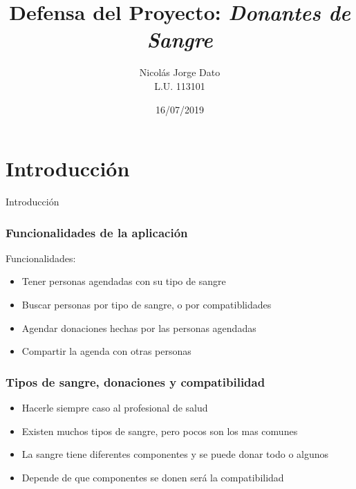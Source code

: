 \documentclass{beamer}
\title{Defensa del Proyecto: \emph{Donantes de Sangre}}
\author{Nicol\'as Jorge Dato\\L.U. 113101}
\institute{Universidad Nacional del Sur}
\date{16/07/2019}
\begin{document}
	\begin{frame}
		\maketitle
	\end{frame}

	\section{Introducci\'on}
		\begin{frame}
			\Huge Introducci\'on
		\end{frame}
		\begin{frame}
			\frametitle{Funcionalidades de la aplicaci\'on}
			Funcionalidades:
			\begin{itemize}
				\item Tener personas agendadas con su tipo de sangre
				\item Buscar personas por tipo de sangre, o por compatiblidades
				\item Agendar donaciones hechas por las personas agendadas
				\item Compartir la agenda con otras personas
			\end{itemize}
		\end{frame}
		\begin{frame}
			\frametitle{Tipos de sangre, donaciones y compatibilidad}
			\begin{itemize}
				\item Hacerle siempre caso al profesional de salud
				\item Existen muchos tipos de sangre, pero pocos son los mas comunes
				\item La sangre tiene diferentes componentes y se puede donar todo o algunos
				\item Depende de que componentes se donen ser\'a la compatibilidad
			\end{itemize}
		\end{frame}
\end{document}
